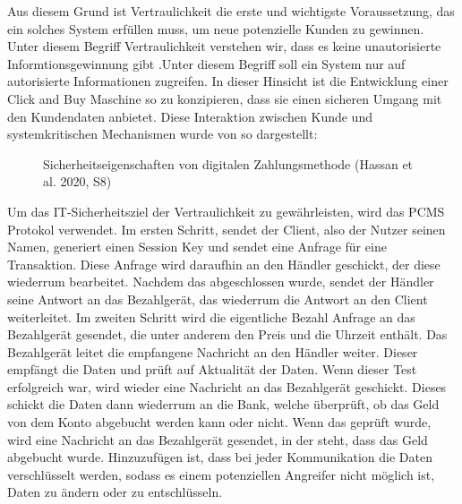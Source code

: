 Aus diesem Grund ist Vertraulichkeit die erste und wichtigste Voraussetzung, das ein solches System 
erfüllen muss, um neue potenzielle Kunden zu gewinnen. Unter diesem Begriff Vertraulichkeit verstehen wir, 
dass es keine unautorisierte Informtionsgewinnung gibt \cite{refbook:SWIS} .Unter diesem Begriff soll
ein System nur auf autorisierte Informationen zugreifen. In dieser Hinsicht ist die Entwicklung 
einer Click and Buy Maschine so zu konzipieren, dass sie einen sicheren Umgang mit den Kundendaten
anbietet. Diese Interaktion zwischen Kunde und systemkritischen Mechanismen wurde von
\cite{refart:HARE} so dargestellt:

\vfill
\begin{figure}[htb]
    \caption{Sicherheitseigenschaften von digitalen Zahlungsmethode (Hassan et al. 2020, S8)}
    \label{fig:refark_HARE}
\end{figure}
\vfill


Um das IT-Sicherheitsziel der Vertraulichkeit zu gewährleisten, wird das PCMS Protokol verwendet. 
Im ersten Schritt, sendet der Client, also der Nutzer seinen Namen, generiert einen Session Key 
und sendet eine Anfrage für eine Transaktion. Diese Anfrage wird daraufhin an den Händler geschickt,
der diese wiederrum bearbeitet. Nachdem das abgeschlossen wurde, sendet der Händler seine Antwort
an das Bezahlgerät, das wiederrum die Antwort an den Client weiterleitet. Im zweiten Schritt wird
die eigentliche Bezahl Anfrage an das Bezahlgerät gesendet, die unter anderem den Preis und die 
Uhrzeit enthält. Das Bezahlgerät leitet die empfangene Nachricht an den Händler weiter. 
Dieser empfängt die Daten und prüft auf Aktualität der Daten. Wenn dieser Test erfolgreich war, 
wird wieder eine Nachricht an das Bezahlgerät geschickt. Dieses schickt die Daten dann wiederrum 
an die Bank, welche überprüft, ob das Geld von dem Konto abgebucht werden kann oder nicht.
Wenn das geprüft wurde, wird eine Nachricht an das Bezahlgerät gesendet, in der steht, dass das
Geld abgebucht wurde. Hinzuzufügen ist, dass bei jeder Kommunikation die Daten verschlüsselt werden, 
sodass es einem potenziellen Angreifer nicht möglich ist, Daten zu ändern oder zu entschlüsseln.

